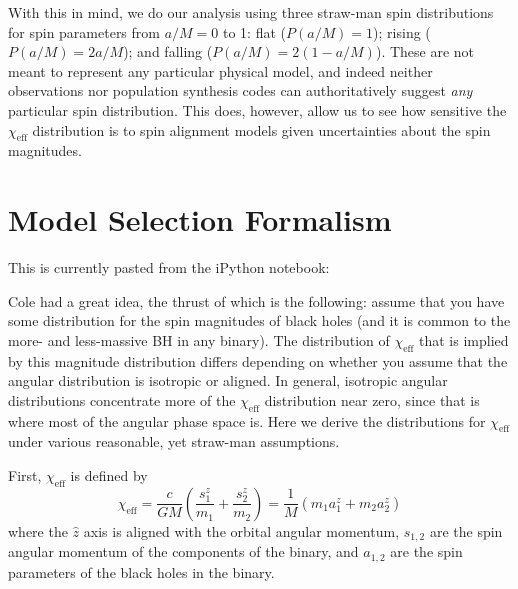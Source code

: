 \documentclass[modern]{aastex61}
\newcommand{\chieff}{\chi_\mathrm{eff}}
\begin{document}
With this in mind, we do our analysis using three straw-man spin distributions for 
spin parameters from $a/M=0$ to 1: flat ($P(a/M)=1$); rising ($P(a/M)=2a/M$); and 
falling ($P(a/M)=2(1-a/M)$).  These are not meant to represent any particular 
physical model, and indeed neither observations nor population synthesis codes 
can authoritatively suggest {\it any} particular spin distribution.  This does, 
however, allow us to see how sensitive the $\chieff$ distribution is to spin alignment 
models given uncertainties about the spin magnitudes.


\section{Model Selection Formalism}
\label{sec:formalism}

This is currently pasted from the iPython notebook:

Cole had a great idea, the thrust of which is the following: assume
that you have some distribution for the spin magnitudes of black holes
(and it is common to the more- and less-massive BH in any binary).
The distribution of $\chieff$ that is implied by this magnitude
distribution differs depending on whether you assume that the angular
distribution is isotropic or aligned.  In general, isotropic angular
distributions concentrate more of the $\chieff$ distribution near
zero, since that is where most of the angular phase space is.  Here we
derive the distributions for $\chieff$ under various reasonable, yet
straw-man assumptions.

First, $\chieff$ is defined by
\begin{equation}
\chieff = \frac{c}{GM} \left( \frac{s_1^z}{m_1} + \frac{s_2^z}{m_2}
\right) = \frac{1}{M} \left( m_1 a_1^z + m_2 a_2^z \right)
\end{equation}
where the $\hat{z}$ axis is aligned with the orbital angular momentum,
$s_{1,2}$ are the spin angular momentum of the components of the
binary, and $a_{1,2}$ are the spin parameters of the black holes in
the binary.
\end{document}
